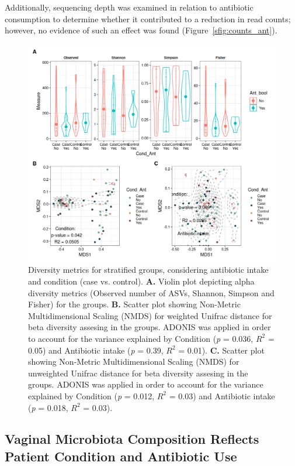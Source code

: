 \documentclass[biotech,article,submit,pdftex,moreauthors]{Definitions/mdpi}
\begin{document}
Additionally, sequencing depth was examined in relation to antibiotic consumption to determine whether it contributed to a reduction in read counts; however, no evidence of such an effect was found (Figure~{\ref{sfig:counts_ant}}).

\begin{figure}[H]
    \centering
    \includegraphics[width = \textwidth]{figures/diversity.png}
    \caption{ Diversity metrics for stratified groups, considering antibiotic intake and condition (case vs. control). \textbf{A.} Violin plot depicting alpha diversity metrics (Observed number of ASVs, Shannon, Simpson and Fisher) for the groups. \textbf{B.} Scatter plot showing Non-Metric Multidimensional Scaling (NMDS) for weighted Unifrac distance for beta diversity assesing in the groups. ADONIS was applied in order to account for the variance explained by Condition (\textit{p} = 0.036, $R^{2}$ = 0.05) and Antibiotic intake (\textit{p} = 0.39, $R^{2}$ = 0.01). \textbf{C.} Scatter plot showing Non-Metric Multidimensional Scaling (NMDS) for unweighted Unifrac distance for beta diversity assesing in the groups. ADONIS was applied in order to account for the variance explained by Condition (\textit{p} = 0.012, $R^{2}$ = 0.03) and Antibiotic intake (\textit{p} = 0.018, $R^{2}$ = 0.03).}
	\label{fig:diversity}
\end{figure}

\subsection{Vaginal Microbiota Composition Reflects Patient Condition and Antibiotic Use}
\end{document}

